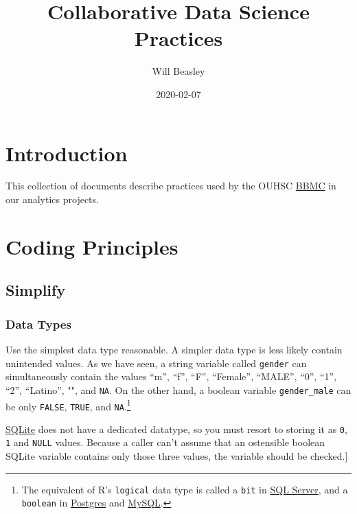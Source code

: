 \documentclass[
]{book}
\title{Collaborative Data Science Practices}
\author{Will Beasley}
\date{2020-02-07}
\begin{document}
\maketitle

{
\setcounter{tocdepth}{1}
\tableofcontents
}
\hypertarget{intro}{%
\chapter{Introduction}\label{intro}}

This collection of documents describe practices used by the OUHSC \href{https://ouhsc.edu/bbmc}{BBMC} in our analytics projects.

\hypertarget{coding}{%
\chapter{Coding Principles}\label{coding}}

\hypertarget{coding-simplify}{%
\section{Simplify}\label{coding-simplify}}

\hypertarget{coding-simplify-types}{%
\subsection{Data Types}\label{coding-simplify-types}}

Use the simplest data type reasonable. A simpler data type is less likely contain unintended values. As we have seen, a string variable called \texttt{gender} can simultaneously contain the values ``m'', ``f'', ``F'', ``Female'', ``MALE'', ``0'', ``1'', ``2'', ``Latino'', "", and \texttt{NA}. On the other hand, a boolean variable \texttt{gender\_male} can be only \texttt{FALSE}, \texttt{TRUE}, and \texttt{NA}.\footnote{The equivalent of R's \texttt{logical} data type is called a \texttt{bit} in \href{https://docs.microsoft.com/en-us/sql/t-sql/data-types/bit-transact-sql}{SQL Server}, and a \texttt{boolean} in \href{https://www.postgresql.org/docs/current/datatype-boolean.html}{Postgres} and \href{https://dev.mysql.com/doc/refman/8.0/en/boolean-literals.html}{MySQL}.}

\href{https://www.sqlite.org/datatype3.html}{SQLite} does not have a dedicated datatype, so you must resort to storing it as \texttt{0}, \texttt{1} and \texttt{NULL} values. Because a caller can't assume that an ostensible boolean SQLite variable contains only those three values, the variable should be checked.{]}
\end{document}
